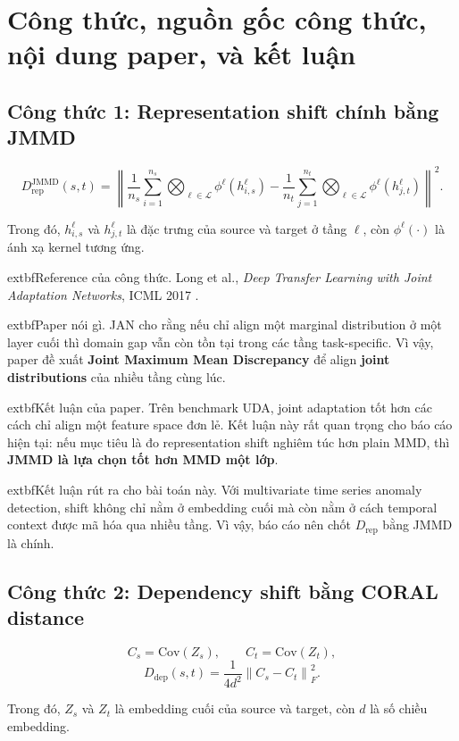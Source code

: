 \documentclass[a4paper]{article}
\begin{document}
\section{Công thức, nguồn gốc công thức, nội dung paper, và kết luận}

\subsection{Công thức 1: Representation shift chính bằng JMMD}

\[
D_{\mathrm{rep}}^{\mathrm{JMMD}}(s,t)
= \left\|
\frac{1}{n_s}\sum_{i=1}^{n_s} \bigotimes_{\ell \in \mathcal{L}} \phi^{\ell}(h_{i,s}^{\ell})
-
\frac{1}{n_t}\sum_{j=1}^{n_t} \bigotimes_{\ell \in \mathcal{L}} \phi^{\ell}(h_{j,t}^{\ell})
\right\|^2.
\]

Trong đó, \(h_{i,s}^{\ell}\) và \(h_{j,t}^{\ell}\) là đặc trưng của source và target ở tầng \(\ell\), còn \(\phi^{\ell}(\cdot)\) là ánh xạ kernel tương ứng.

	extbf{Reference của công thức.} Long et al., \emph{Deep Transfer Learning with Joint Adaptation Networks}, ICML 2017 \cite{jan}.

	extbf{Paper nói gì.} JAN cho rằng nếu chỉ align một marginal distribution ở một layer cuối thì domain gap vẫn còn tồn tại trong các tầng task-specific. Vì vậy, paper đề xuất \textbf{Joint Maximum Mean Discrepancy} để align \textbf{joint distributions} của nhiều tầng cùng lúc.

	extbf{Kết luận của paper.} Trên benchmark UDA, joint adaptation tốt hơn các cách chỉ align một feature space đơn lẻ. Kết luận này rất quan trọng cho báo cáo hiện tại: nếu mục tiêu là đo representation shift nghiêm túc hơn plain MMD, thì \textbf{JMMD là lựa chọn tốt hơn MMD một lớp}.

	extbf{Kết luận rút ra cho bài toán này.} Với multivariate time series anomaly detection, shift không chỉ nằm ở embedding cuối mà còn nằm ở cách temporal context được mã hóa qua nhiều tầng. Vì vậy, báo cáo nên chốt \(D_{\mathrm{rep}}\) bằng JMMD là chính.

\subsection{Công thức 2: Dependency shift bằng CORAL distance}

\[
C_s = \mathrm{Cov}(Z_s),
\qquad
C_t = \mathrm{Cov}(Z_t),
\]
\[
D_{\mathrm{dep}}(s,t) = \frac{1}{4d^2}\left\| C_s - C_t \right\|_F^2.
\]

Trong đó, \(Z_s\) và \(Z_t\) là embedding cuối của source và target, còn \(d\) là số chiều embedding.
\end{document}

